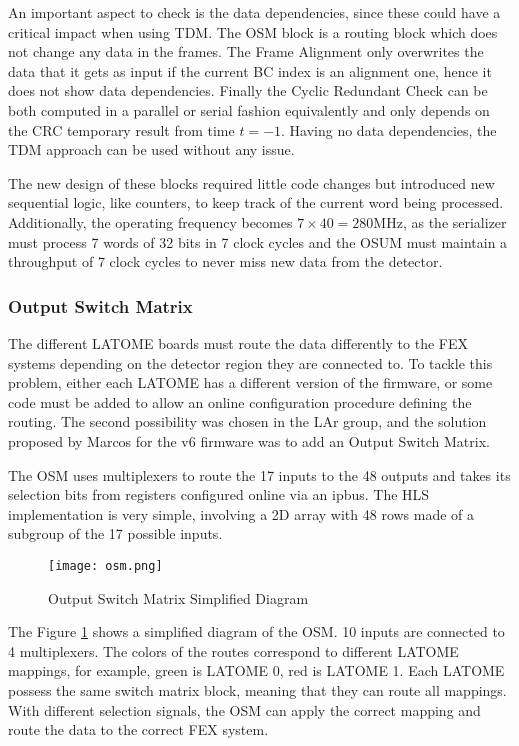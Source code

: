 \begin{itemize}
An important aspect to check is the data dependencies, since these could have a critical impact when using TDM. The OSM block is a routing block which does not change any data in the frames. The Frame Alignment only overwrites the data that it gets as input if the current BC index is an alignment one, hence it does not show data dependencies. Finally the Cyclic Redundant Check can be both computed in a parallel or serial fashion equivalently and only depends on the CRC temporary result from time \(t=-1\). Having no data dependencies, the TDM approach can be used without any issue.

The new design of these blocks required little code changes but introduced new sequential logic, like counters, to keep track of the current word being processed. Additionally, the operating frequency becomes \(7\times40=280\)MHz, as the serializer must process 7 words of 32 bits in 7 clock cycles and the OSUM must maintain a throughput of 7 clock cycles to never miss new data from the detector.

\subsubsection{Output Switch Matrix}

The different LATOME boards must route the data differently to the FEX systems depending on the detector region they are connected to. To tackle this problem, either each LATOME has a different version of the firmware, or some code must be added to allow an online configuration procedure defining the routing. The second possibility was chosen in the LAr group, and the solution proposed by Marcos for the v6 firmware was to add an Output Switch Matrix. 

The OSM uses multiplexers to route the 17 inputs to the 48 outputs and takes its selection bits from registers configured online via an ipbus. The HLS implementation is very simple, involving a 2D array with 48 rows made of a subgroup of the 17 possible inputs.

\begin{figure}
    \centering
    \texttt{[image: osm.png]}
    \caption{Output Switch Matrix Simplified Diagram}
    \label{fig:osm-design}
\end{figure}

The Figure \ref{fig:osm-design} shows a simplified diagram of the OSM. 10 inputs are connected to 4 multiplexers. The colors of the routes correspond to different LATOME mappings, for example, green is LATOME 0, red is LATOME 1. Each LATOME possess the same switch matrix block, meaning that they can route all mappings. With different selection signals, the OSM can apply the correct mapping and route the data to the correct FEX system.


\end{itemize}
